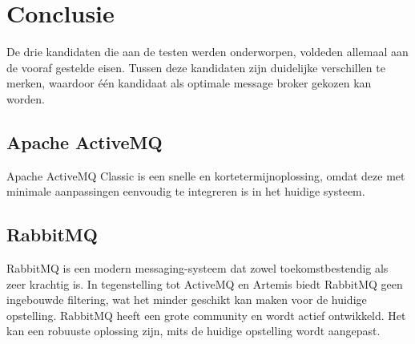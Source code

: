 
\chapter{Conclusie}%
\label{ch:conclusie}


De drie kandidaten die aan de testen werden onderworpen, voldeden allemaal aan de vooraf gestelde eisen.
Tussen deze kandidaten zijn duidelijke verschillen te merken, waardoor één kandidaat als optimale message broker gekozen kan worden.

\section{Apache ActiveMQ}
Apache ActiveMQ Classic is een snelle en kortetermijnoplossing, omdat deze met minimale aanpassingen eenvoudig te integreren is in het huidige systeem.

\section{RabbitMQ}
RabbitMQ is een modern messaging-systeem dat zowel toekomstbestendig als zeer krachtig is.
In tegenstelling tot ActiveMQ en Artemis biedt RabbitMQ geen ingebouwde filtering, wat het minder geschikt kan maken voor de huidige opstelling.
RabbitMQ heeft een grote community en wordt actief ontwikkeld. Het kan een robuuste oplossing zijn, mits de huidige opstelling wordt aangepast.

